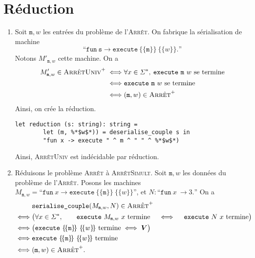 \section{Réduction}

\begin{enumerate}
	\item Soit $\texttt{m},w$\/ les entrées du problème de l'\textsc{Arrêt}. On fabrique la sérialisation de machine \[
			\text{``} \texttt{fun}\ \texttt{s} \to \texttt{execute}\ \{\!\{\texttt{m}\}\!\}\ \{\!\{w\}\!\}. \text{''}
		\] Notons $M'_{\texttt{m},w}$\/ cette machine. On a
		\begin{align*}
			M'_{\texttt{m},w} \in \textsc{ArrêtUniv}^+ \iff& \forall x \in \Sigma^*,\: \texttt{execute}\ \texttt{m}\ w \text{ se termine}\\
			\iff& \texttt{execute}\ \texttt{m}\ w \text{ se termine}\\
			\iff& (\texttt{m},w) \in \textsc{Arrêt}^+
		\end{align*}
		Ainsi, on crée la réduction.
		\begin{lstlisting}[language=caml,caption=Réduction de \textsc{ArrêtUniv} au problème de l'\textsc{Arrêt}]
	let reduction (s: string): string =
		let (m, %*$w$*)) = deserialise_couple s in
		"fun x -> execute " ^ m ^ " " ^ %*$w$*)
		\end{lstlisting}
		Ainsi, \textsc{ArrêtUniv} est indécidable par réduction.
	\item Réduisons le problème \textsc{Arrêt} à \textsc{ArrêtSimult}. Soit $\texttt{m}, w$\/ les données du problème de l'\textsc{Arrêt}. Posons les machines $M_{\texttt{m},w} = \text{``}\texttt{fun}\ x \to \texttt{execute}\ \{\!\{\texttt{m}\}\!\}\ \{\!\{w\}\!\}\text{''}$, et $N : \text{``}\texttt{fun}\ x\ \to 3. \text{''}$ On a
		\begin{align*}
			&\texttt{serialise\_couple} (M_{\texttt{m},w}, N) \in \textsc{Arrêt}^+\\
			\iff& \big(\forall x \in \Sigma^*,\qquad \texttt{execute}\ M_{\texttt{m},w}\ x \text{ termine}\quad\iff\quad \texttt{execute}\ N\ x \text{ termine}\big)\\
			\iff& \big(\texttt{execute}\ \{\!\{\texttt{m}\}\!\}\ \{\!\{w\}\!\} \text{ termine} \iff \mathbf{V}\big)\\
			\iff& \texttt{execute}\ \{\!\{\texttt{m}\}\!\}\ \{\!\{w\}\!\} \text{ termine}\\
			\iff& (\texttt{m},w) \in \textsc{Arrêt}^+.
		\end{align*}
		

\end{enumerate}
